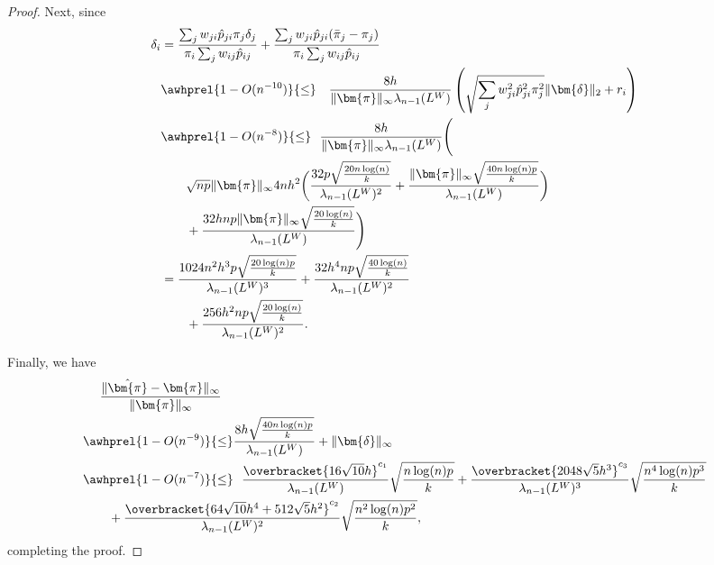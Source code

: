\documentclass[sigconf,nonacm,pbalance]{acmart}
\begin{document}
\begin{proof}
Next, since
\begin{align}
\delta_i &= \frac{\sum_j w_{ji} \hat{p}_{ji} \pi_j \delta_j}{\pi_i\sum_j w_{ij}\hat{p}_{ij} } + \frac{\sum_j w_{ji} \hat{p}_{ji} (\bar{\pi}_j-\pi_j)}{\pi_i \sum_j w_{ij} \hat{p}_{ij}} \\
&\awhprel{1-O(n^{-10})}{\leq}\ \ \ \frac{8h}{\|\bm{\pi}\|_\infty \lambda_{n-1}(L^W)} \left(\sqrt{\sum_j w_{ji}^2 \hat{p}_{ji}^2 \pi_j^2} \|\bm{\delta}\|_2 + r_i\right) \\
&\awhprel{1-O(n^{-8})}{\leq} \ \  \frac{8h}{\|\bm{\pi}\|_\infty \lambda_{n-1}(L^W)} \Biggl(\\
&\qquad\sqrt{np} \|\bm{\pi}\|_\infty  4nh^2\biggl(\frac{32p \sqrt{\frac{20n\log(n)}{k}}}{\lambda_{n-1}(L^W)^2}+ \frac{\|\bm{\pi}\|_\infty\sqrt{\frac{40n\log(n)p}{k}}}{\lambda_{n-1}(L^W)}\biggr) \\
&\qquad + \frac{32hnp\|\bm{\pi}\|_\infty \sqrt{\frac{20\log(n)}{k}}}{\lambda_{n-1}(L^W)}\Biggr) \\
&= \frac{1024n^2h^3p \sqrt{\frac{20\log(n)p}{k}}}{\lambda_{n-1}(L^W)^3} + \frac{32 h^4np \sqrt{\frac{40\log(n)}{k}}}{\lambda_{n-1}(L^W)^2} \\
&\qquad + \frac{256h^2np \sqrt{\frac{20\log(n)}{k}}}{\lambda_{n-1}(L^W)^2}.
\end{align}

Finally, we have
\begin{align}
&\phantom{{}={}}\frac{\|\hat{\bm{\pi}}-\bm{\pi}\|_\infty}{\|\bm{\pi}\|_\infty} \\
&\awhprel{1-O(n^{-9})}{\leq} \frac{8h \sqrt{\frac{40n\log(n)p}{k}}}{\lambda_{n-1}(L^W)} + \|\bm{\delta}\|_\infty \\
&\awhprel{1-O(n^{-7})}{\leq}\ \ \frac{\overbracket{16\sqrt{10}h}^{c_1}}{\lambda_{n-1}(L^W)}\sqrt{\frac{n\log(n)p}{k}} + \frac{\overbracket{2048\sqrt{5}h^3}^{c_3}}{\lambda_{n-1}(L^W)^3} \sqrt{\frac{n^4\log(n)p^3}{k}} \\
&\qquad +\frac{\overbracket{64\sqrt{10}h^4+512\sqrt{5}h^2}^{c_2}}{\lambda_{n-1}(L^W)^2}\sqrt{\frac{n^2\log(n)p^2}{k}},
\end{align}
completing the proof.
\end{proof}
\end{document}
